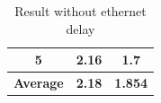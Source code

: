 \begin{table}[h!]
{\begin{tabular}{|c|c|c|}
5                                                              & 2.16                                                                                                                                                & 1.7                                                                                                                                             \\ \hline 
\multicolumn{1}{|l|}{\textbf{Average}} & \textbf{2.18}                                                                                                                                       & \textbf{1.854}                                                                                                                                  \\ \hline
\end{tabular}
}
\caption{Result without ethernet delay}
\end{table}
